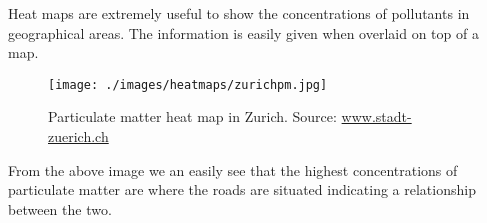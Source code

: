 Heat maps are extremely useful to show the concentrations of pollutants in geographical areas. The information is easily given when overlaid on top of a map.  

\begin{figure}[H]
        \begin{center}
                \texttt{[image: ./images/heatmaps/zurichpm.jpg]}
                \caption{Particulate matter heat map in Zurich. Source: \url{www.stadt-zuerich.ch}}
                \label{fig:pmheatmapzurich}
        \end{center}
\end{figure}

From the above image we an easily see that the highest concentrations of particulate matter are where the roads are situated indicating a relationship between the two. 




